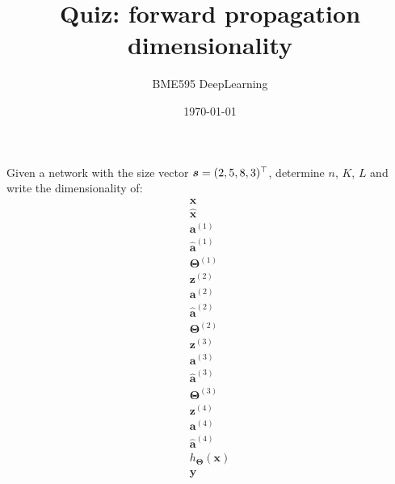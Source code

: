 \documentclass{article}
\newcommand\rint{\pgfmathparse{random(10)}\pgfmathresult}
\begin{document}
\title{Quiz: forward propagation dimensionality}
\author{BME595 DeepLearning}
\date{\today}
\maketitle

Given a network with the size vector $\bm{s}=(\rint, \rint, \rint, \rint)^\top$, determine $n$, $K$, $L$ and write the dimensionality of:
%
\begin{align*}
  \bm{x}            \\
  \bm{\hat x}       \\
  \bm{a}^{(1)}      \\
  \bm{\hat a}^{(1)} \\
  \bm{\Theta}^{(1)} \\
  \bm{z}^{(2)}      \\
  \bm{a}^{(2)}      \\
  \bm{\hat a}^{(2)} \\
  \bm{\Theta}^{(2)} \\
  \bm{z}^{(3)}      \\
  \bm{a}^{(3)}      \\
  \bm{\hat a}^{(3)} \\
  \bm{\Theta}^{(3)} \\
  \bm{z}^{(4)}      \\
  \bm{a}^{(4)}      \\
  \bm{\hat a}^{(4)} \\
  h_{\bm{\Theta}}(\bm{x}) \\
  \bm{y}
\end{align*}
\end{document}
